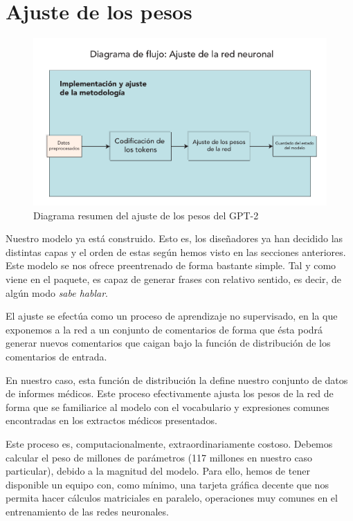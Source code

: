 \section{Ajuste de los pesos}
\begin{figure}[h]
	\centering
	\includegraphics[width=.9\textwidth]{media/gpt-fine-tune.pdf}
	\caption{Diagrama resumen del ajuste de los pesos del GPT-2}
	\label{fig:fine-tune-gpt}
\end{figure}

Nuestro modelo ya está construido. Esto es, los diseñadores ya han decidido las distintas capas y el orden de estas según hemos visto en las secciones anteriores. Este modelo se nos ofrece preentrenado de forma bastante simple. Tal y como viene en el paquete, es capaz de generar frases con relativo sentido, es decir, de algún modo \textit{sabe hablar}. 

El ajuste se efectúa como un proceso de aprendizaje no supervisado, en la que exponemos a la red a un conjunto de comentarios de forma que ésta podrá generar nuevos comentarios que caigan bajo la función de distribución de los comentarios de entrada. 

En nuestro caso, esta función de distribución la define nuestro conjunto de datos de informes médicos. Este proceso efectivamente ajusta los pesos de la red de forma que se familiarice al modelo con el vocabulario y expresiones comunes encontradas en los extractos médicos presentados.

Este proceso es, computacionalmente, extraordinariamente costoso. Debemos calcular el peso de millones de parámetros (117 millones en nuestro caso particular), debido a la magnitud del modelo. Para ello, hemos de tener disponible un equipo con, como mínimo, una tarjeta gráfica decente que nos permita hacer cálculos matriciales en paralelo, operaciones muy comunes en el entrenamiento de las redes neuronales.

